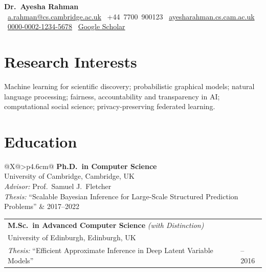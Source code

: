 \documentclass[a4paper,11pt]{article}
\makeatletter
\newcommand{\cventry}[2]{%
  \begin{tabularx}{\linewidth}{@{}X@{\hspace{4pt}}>{\raggedleft\arraybackslash}p{4.6cm}@{}}
    #1 & #2 \\
  \end{tabularx}%
}
\newcommand{\entrysep}{\vspace{3pt}}
\makeatother
\begin{document}
\begin{center}
  {\fontsize{26}{30}\selectfont\bfseries\color{accent} Dr.\ Ayesha Rahman}\\[6pt]
  {\small
    \faEnvelope\ \href{mailto:a.rahman@cs.cambridge.ac.uk}{a.rahman@cs.cambridge.ac.uk}
    \quad\textbar\quad
    \faPhone\ +44~7700~900123
    \quad\textbar\quad
    \faGlobe\ \href{https://ayesharahman.cs.cam.ac.uk}{ayesharahman.cs.cam.ac.uk}
    \quad\textbar\quad
    \faOrcid\ \href{https://orcid.org/0000-0002-1234-5678}{0000-0002-1234-5678}
    \quad\textbar\quad
    \faGraduationCap\ \href{https://scholar.google.com/citations?user=EXAMPLE}{Google Scholar}
  }
\end{center}

\vspace{4pt}

\section{Research Interests}

Machine learning for scientific discovery; probabilistic graphical models;
natural language processing; fairness, accountability and transparency in AI;
computational social science; privacy-preserving federated learning.

\section{Education}

\cventry{%
  \textbf{Ph.D.\ in Computer Science}\\
  University of Cambridge, Cambridge, UK\\
  \textit{Advisor:} Prof.\ Samuel J.\ Fletcher\\
  \textit{Thesis:} ``Scalable Bayesian Inference for Large-Scale Structured Prediction Problems''
}{2017--2022}

\entrysep

\cventry{%
  \textbf{M.Sc.\ in Advanced Computer Science} \textit{(with Distinction)}\\
  University of Edinburgh, Edinburgh, UK\\
  \textit{Thesis:} ``Efficient Approximate Inference in Deep Latent Variable Models''
}{2015--2016}
\end{document}
